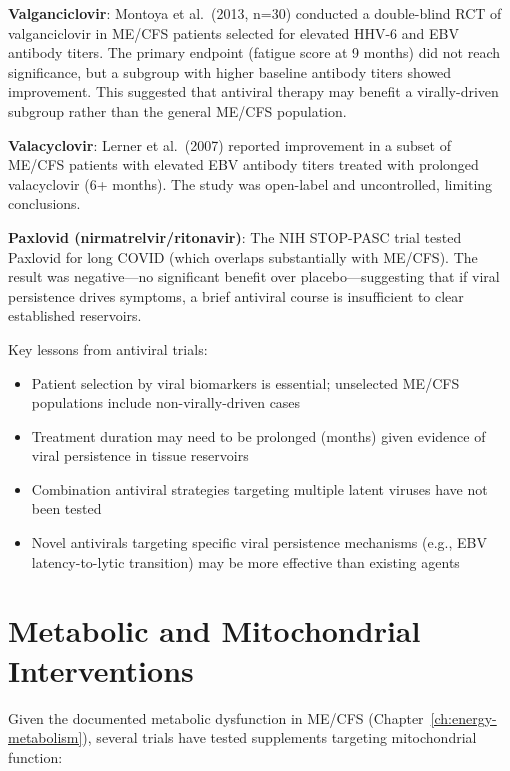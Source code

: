 \textbf{Valganciclovir}: Montoya et al.\ (2013, n=30) conducted a double-blind RCT of valganciclovir in ME/CFS patients selected for elevated HHV-6 and EBV antibody titers. The primary endpoint (fatigue score at 9 months) did not reach significance, but a subgroup with higher baseline antibody titers showed improvement. This suggested that antiviral therapy may benefit a virally-driven subgroup rather than the general ME/CFS population.

\textbf{Valacyclovir}: Lerner et al.\ (2007) reported improvement in a subset of ME/CFS patients with elevated EBV antibody titers treated with prolonged valacyclovir (6+ months). The study was open-label and uncontrolled, limiting conclusions.

\textbf{Paxlovid (nirmatrelvir/ritonavir)}: The NIH STOP-PASC trial tested Paxlovid for long COVID (which overlaps substantially with ME/CFS). The result was negative---no significant benefit over placebo---suggesting that if viral persistence drives symptoms, a brief antiviral course is insufficient to clear established reservoirs.

Key lessons from antiviral trials:

\begin{itemize}
    \item Patient selection by viral biomarkers is essential; unselected ME/CFS populations include non-virally-driven cases
    \item Treatment duration may need to be prolonged (months) given evidence of viral persistence in tissue reservoirs
    \item Combination antiviral strategies targeting multiple latent viruses have not been tested
    \item Novel antivirals targeting specific viral persistence mechanisms (e.g., EBV latency-to-lytic transition) may be more effective than existing agents
\end{itemize}

\section{Metabolic and Mitochondrial Interventions}
\label{sec:trials-metabolic}

Given the documented metabolic dysfunction in ME/CFS (Chapter~\ref{ch:energy-metabolism}), several trials have tested supplements targeting mitochondrial function:

